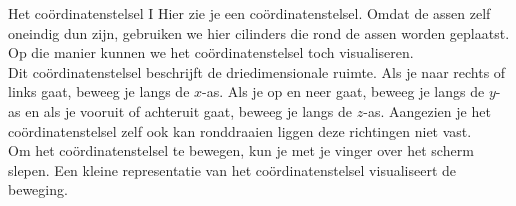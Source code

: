 \begin{surferPage}[Co\"ordinaten I]{Het co\"ordinatenstelsel I}
Hier zie je een co\"ordinatenstelsel. Omdat de assen zelf oneindig dun zijn, gebruiken we hier cilinders die rond de assen worden geplaatst. Op die manier kunnen we het co\"ordinatenstelsel toch visualiseren.\\
Dit co\"ordinatenstelsel beschrijft de driedimensionale ruimte. Als je naar rechts of links gaat, beweeg je langs de $x$-as. Als je op en neer gaat, beweeg je langs de $y$-as en als je vooruit of achteruit gaat, beweeg je langs de $z$-as. Aangezien je het co\"ordinatenstelsel zelf ook kan ronddraaien liggen deze richtingen niet vast.\\
\vspace{0.3cm}
Om het co\"ordinatenstelsel te bewegen, kun je met je vinger over het scherm slepen. Een kleine representatie van het co\"ordinatenstelsel visualiseert de beweging. 
\end{surferPage}

